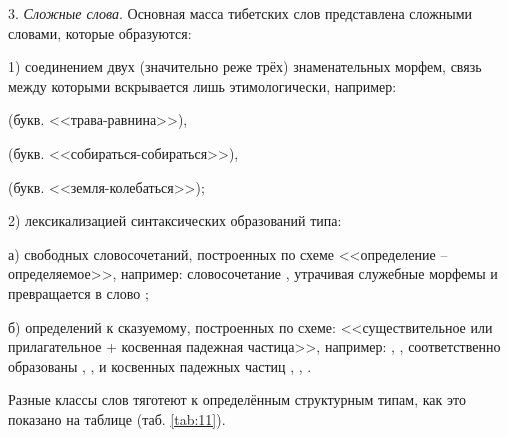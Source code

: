 3. \emph{Сложные слова}. Основная масса тибетских слов представлена сложными словами, которые образуются:

1) соединением двух (значительно реже трёх) знаменательных морфем, связь между которыми вскрывается лишь этимологически, например:
\begin{prfsample}
	\item {} (букв. <<трава-равнина>>),
	\item {} (букв. <<собираться-собираться>>),
	\item {} (букв. <<земля-колебаться>>);
\end{prfsample}

2)	лексикализацией синтаксических образований типа:

а) свободных словосочетаний, построенных по схеме <<определение -- определяемое>>, например: словосочетание
, утрачивая служебные морфемы  и  превращается в слово ;

б) определений к сказуемому, построенных по схеме: <<существительное или прилагательное + косвенная падежная частица>>, например: , ,  соответственно образованы , ,  и косвенных падежных частиц , , .

Разные классы слов тяготеют к определённым структурным типам, как это показано на таблице (таб. \ref{tab:11}).

